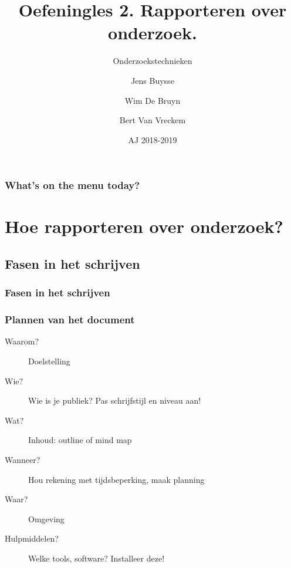 \documentclass[aspectratio=169]{beamer}
\title[OZT: rapporteren]{Oefeningles 2. Rapporteren over onderzoek.}
\subtitle{Onderzoekstechnieken}
\author{Jens Buysse \and Wim {De Bruyn} \and Bert {Van Vreckem}}
\date{AJ 2018-2019}
\begin{document}

\begin{frame}
\maketitle
\end{frame}

\begin{frame}
\frametitle{What's on the menu today?}

\tableofcontents
\end{frame}

\section{Hoe rapporteren over onderzoek?}

\subsection{Fasen in het schrijven}


\begin{frame}
  \frametitle{Fasen in het schrijven}
  \centering
\end{frame}

\begin{frame}
  \frametitle{Plannen van het document}

  \begin{description}
    \item[Waarom?] Doelstelling
    \item[Wie?] Wie is je publiek? Pas schrijfstijl en niveau aan!
    \item[Wat?] Inhoud: outline of mind map
    \item[Wanneer?] Hou rekening met tijdsbeperking, maak planning
    \item[Waar?] Omgeving
    \item[Hulpmiddelen?] Welke tools, software? Installeer deze!
  \end{description}
\end{frame}
\end{document}
